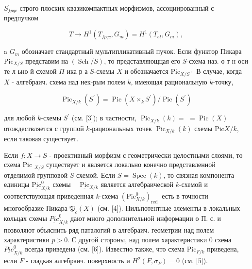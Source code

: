 \documentclass[10pt]{article}
\begin{document}
$S_{f p q c}^{\prime}$ строго плоских квазикомпактных морфизмов, ассоциированный с предпучком



\[

T \longrightarrow H^{1}\left(T_{f p q c}, G_{m}\right)=H^{1}\left(T_{e t}, G_{m}\right),

\]



a $G_{m}$ обозначает стандартный мультипликативный пучок. Если функтор Пикара $\mathrm{Pic}_{X / S}$ представим на $(\operatorname{Sch} / S)$, то представляющцая его $S$-схема наз. о т н оси те л ьно й схемой $\Pi$ ика р а $S$-схемы $X$ и обозначается $\mathrm{Pic}_{X / S} \cdot$ В случае, когда $X$ - алгебраич. схема над нек-рым полем $k$, имеющая рациональную $k$-точку,



\[

\operatorname{Pic}_{X / k}\left(S^{\prime}\right)=\operatorname{Pic}\left(X \times_{k} S^{\prime}\right) / \operatorname{Pic}\left(S^{\prime}\right)

\]



для любой $k$-схемы $S^{\prime}$ (см. [3]); в частности, $\operatorname{Pic}_{X / k}(k)=$ $=\operatorname{Pic}(X)$ отождествляется с группой $k$-рациональных точек $\operatorname{Pic}_{X / k}(k)$ схемы $\mathrm{Pic} X / k$, если таковая существует.



Если $f: X \rightarrow S$ - проективный морфизм с геометрически целостными слоями, то схема Pic ${ }_{X / S}$ существует и является локально конечно представленной отделимой групповой $S$-схемой. Если $S=\operatorname{Spec}(k)$, то связная компонента единицы $\underline{\mathrm{Pic}}_{X / k}^{0}$ схемы $\quad \underline{\mathrm{Pic}}{ }_{X / k}$ является алгебраической $k$-схемой и соответствующая приведенная $k$-схема $\left(\mathrm{Pic}_{X / k}^{0}\right)_{\text {red }}$ есть в точности многообразие Пикара $\mathfrak{P}_{c}(X)$ (см. [4]). Нильпотентные элементы в локальных кольцах схемы $\underline{P i c}_{X / k}^{0}$ дают много дополнительной информации о П. с. и позволяют объяснить ряд паталогий в алгебраич. геометрии над полем характеристики $p>0$. С другой стороны, над полем характеристики 0 схема $\underline{P i c}_{X / k}^{0}$ всегда приведена (см. [6]). Известно также, что схема $\mathrm{Pic}_{F / k}$ приведена, если $F$ - гладкая алгебраич. поверхность и $H^{2}\left(F, \sigma_{F}\right)=0$ (см. [5]).
\end{document}
